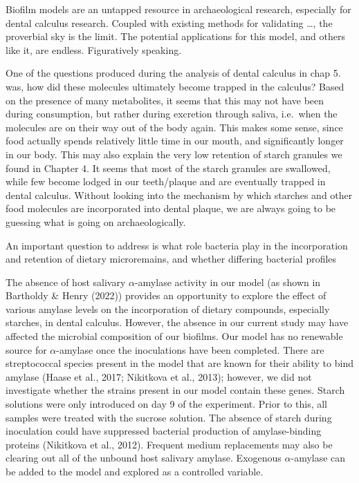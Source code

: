 \documentclass[
  letterpaper,
]{book}
\begin{document}
Biofilm models are an untapped resource in archaeological research,
especially for dental calculus research. Coupled with existing methods
for validating \ldots, the proverbial sky is the limit. The potential
applications for this model, and others like it, are endless.
Figuratively speaking.

One of the questions produced during the analysis of dental calculus in
chap 5. was, how did these molecules ultimately become trapped in the
calculus? Based on the presence of many metabolites, it seems that this
may not have been during consumption, but rather during excretion
through saliva, i.e.~when the molecules are on their way out of the body
again. This makes some sense, since food actually spends relatively
little time in our mouth, and significantly longer in our body. This may
also explain the very low retention of starch granules we found in
Chapter 4. It seems that most of the starch granules are swallowed,
while few become lodged in our teeth/plaque and are eventually trapped
in dental calculus. Without looking into the mechanism by which starches
and other food molecules are incorporated into dental plaque, we are
always going to be guessing what is going on archaeologically.

An important question to address is what role bacteria play in the
incorporation and retention of dietary microremains, and whether
differing bacterial profiles

The absence of host salivary \(\alpha\)-amylase activity in our model
(as shown in Bartholdy \& Henry (2022)) provides an opportunity to
explore the effect of various amylase levels on the incorporation of
dietary compounds, especially starches, in dental calculus. However, the
absence in our current study may have affected the microbial composition
of our biofilms. Our model has no renewable source for
\(\alpha\)-amylase once the inoculations have been completed. There are
streptococcal species present in the model that are known for their
ability to bind amylase (Haase et al., 2017; Nikitkova et al., 2013);
however, we did not investigate whether the strains present in our model
contain these genes. Starch solutions were only introduced on day 9 of
the experiment. Prior to this, all samples were treated with the sucrose
solution. The absence of starch during inoculation could have suppressed
bacterial production of amylase-binding proteins (Nikitkova et al.,
2012). Frequent medium replacements may also be clearing out all of the
unbound host salivary amylase. Exogenous \(\alpha\)-amylase can be added
to the model and explored as a controlled variable.
\end{document}
